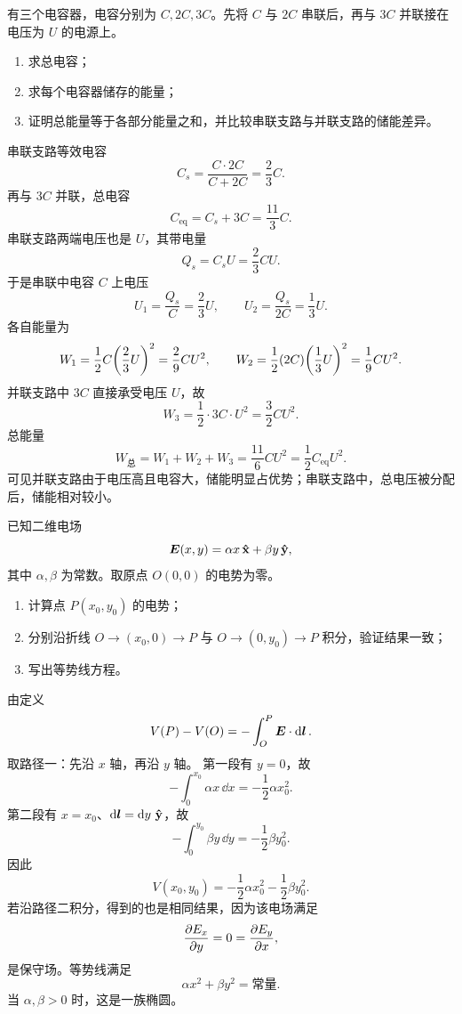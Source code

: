 \begin{competition}
有三个电容器，电容分别为 $C,2C,3C$。先将 $C$ 与 $2C$ 串联后，再与 $3C$ 并联接在电压为 $U$ 的电源上。
\begin{enumerate}
  \item 求总电容；
  \item 求每个电容器储存的能量；
  \item 证明总能量等于各部分能量之和，并比较串联支路与并联支路的储能差异。
\end{enumerate}

\begin{solution}
串联支路等效电容
\[
C_s=\frac{C\cdot 2C}{C+2C}=\frac{2}{3}C.
\]
再与 $3C$ 并联，总电容
\[
C_{\text{eq}}=C_s+3C=\frac{11}{3}C.
\]
串联支路两端电压也是 $U$，其带电量
\[
Q_s=C_sU=\frac{2}{3}CU.
\]
于是串联中电容 $C$ 上电压
\[
U_1=\frac{Q_s}{C}=\frac{2}{3}U,
\qquad
U_2=\frac{Q_s}{2C}=\frac{1}{3}U.
\]
各自能量为
\[
W_1=\frac12 C\qty(\frac{2}{3}U)^2=\frac{2}{9}CU^2,
\qquad
W_2=\frac12 (2C)\qty(\frac{1}{3}U)^2=\frac{1}{9}CU^2.
\]
并联支路中 $3C$ 直接承受电压 $U$，故
\[
W_3=\frac12\cdot 3C\cdot U^2=\frac{3}{2}CU^2.
\]
总能量
\[
W_{\text{总}}=W_1+W_2+W_3=\frac{11}{6}CU^2
=\frac12 C_{\text{eq}}U^2.
\]
可见并联支路由于电压高且电容大，储能明显占优势；串联支路中，总电压被分配后，储能相对较小。
\end{solution}
\end{competition}

\begin{university}
已知二维电场
\[
\vb*{E}(x,y)=\alpha x\,\vu{x}+\beta y\,\vu{y},
\]
其中 $\alpha,\beta$ 为常数。取原点 $O(0,0)$ 的电势为零。
\begin{enumerate}
  \item 计算点 $P(x_0,y_0)$ 的电势；
  \item 分别沿折线 $O\to(x_0,0)\to P$ 与 $O\to(0,y_0)\to P$ 积分，验证结果一致；
  \item 写出等势线方程。
\end{enumerate}

\begin{solution}
由定义
\[
V(P)-V(O)=-\int_O^P \vb*{E}\cdot \dd{\vb*{l}}.
\]
取路径一：先沿 $x$ 轴，再沿 $y$ 轴。
第一段有 $y=0$，故
\[
-\int_0^{x_0} \alpha x\,\dd{x}=-\frac12\alpha x_0^2.
\]
第二段有 $x=x_0$、$\dd{\vb*{l}}=\dd{y}\,\vu{y}$，故
\[
-\int_0^{y_0} \beta y\,\dd{y}=-\frac12\beta y_0^2.
\]
因此
\[
V(x_0,y_0)=-\frac12\alpha x_0^2-\frac12\beta y_0^2.
\]
若沿路径二积分，得到的也是相同结果，因为该电场满足
\[
\pdv{E_x}{y}=0=\pdv{E_y}{x},
\]
是保守场。等势线满足
\[
\alpha x^2+\beta y^2=\text{常量}.
\]
当 $\alpha,\beta>0$ 时，这是一族椭圆。
\end{solution}
\end{university}

